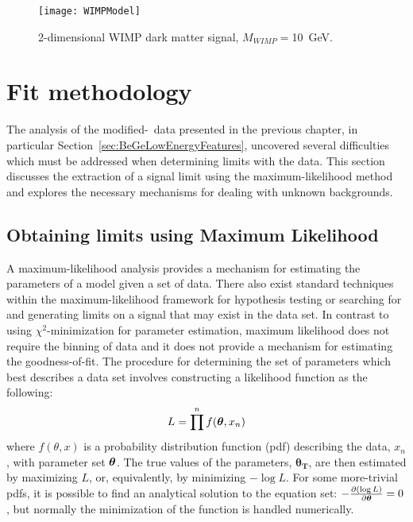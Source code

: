 		\begin{figure}
			\centering
			\texttt{[image: WIMPModel]}
			\caption[2-dimensional WIMP dark matter signal]
			{2-dimensional WIMP dark matter signal, $M_{WIMP} = $10~GeV.}
			\label{fig:2DDMSignal}
		\end{figure}


\section{Fit methodology} 

	The analysis of the modified-\bege~data presented in the previous chapter, in particular Section~\ref{sec:BeGeLowEnergyFeatures}, uncovered several difficulties which must be addressed when determining limits with the data.  This section discusses the extraction of a signal limit using the maximum-likelihood method and explores the necessary mechanisms for dealing with unknown backgrounds.  
	
	\subsection{Obtaining limits using Maximum Likelihood}
	\label{sec:LimitsML}		

A maximum-likelihood analysis provides a mechanism for estimating the parameters of a model given a set of data.  There also exist standard techniques within the maximum-likelihood framework for hypothesis testing or searching for and generating limits on a signal that may exist in the data set.  In contrast to using $\chi^{2}$-minimization for parameter estimation, maximum likelihood does not require the binning of data
 and it does not provide a mechanism for estimating the goodness-of-fit.  The procedure for determining the set of parameters which best describes a data set involves constructing a likelihood function as the following:
		\begin{equation}
		L = \prod^{n} f({\boldsymbol{\theta}}, x_{n})
		\label{eqn:loglikelihood}
		\end{equation}
where $f(\theta, x)$ is a probability distribution function (pdf) describing the data, $x_{n}$, with parameter set $\boldsymbol{\theta}$.  The true values of the parameters, $\boldsymbol{\theta_{T}}$, are then estimated by maximizing $L$, or, equivalently, by minimizing $-\log L$.  For some more-trivial pdfs, it is possible to find an analytical solution to the equation set: $-\frac{\partial ( \log L )}{\partial\boldsymbol{\theta}} = 0$, but normally the minimization of the function is handled numerically.  

